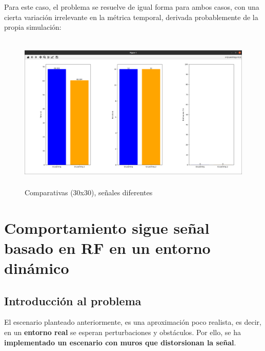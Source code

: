 Para este caso, el problema se resuelve de igual forma para ambos casos, con una cierta variación irrelevante en la métrica temporal, derivada probablemente de la propia simulación:\\

\begin{figure} [H]
    \begin{center}
    \includegraphics[height=7.5cm]{imagenes/cap4/26_comp_diff.png}
    \end{center}
    \caption[Comparativas (30x30), señales diferentes]{Comparativas (30x30), señales diferentes}
    \label{fig:comp_diff_30}
\end{figure}

\section{Comportamiento sigue señal basado en \ac{RF} en un entorno dinámico}
\label{sec:signal_follow_obs}

\subsection{Introducción al problema}
\label{subsec:intro_sfo}

El escenario planteado anteriormente, es una aproximación poco realista, es decir, en un \textbf{entorno real} se esperan perturbaciones y obstáculos. Por ello, se ha \textbf{implementado un escenario con muros que distorsionan la señal}.\\


